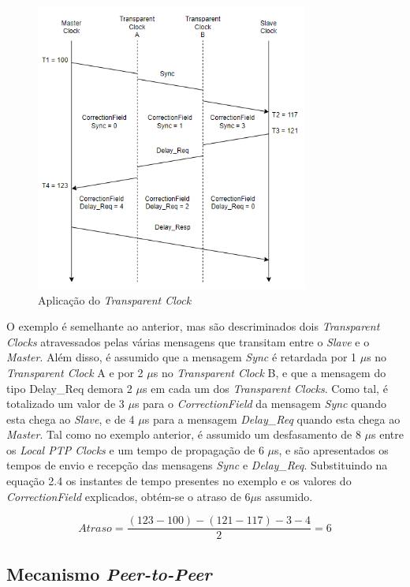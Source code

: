 \begin{figure}[!htb]
  \centering
  \includegraphics[width=0.8\textwidth]{correction.png}
  \caption[Aplicação do \textit{Transparent Clock}]{Aplicação do \textit{Transparent Clock}}
  \label{fig:airbus1}
\end{figure}


O exemplo é semelhante ao anterior, mas são descriminados dois \textit{Transparent Clocks} atravessados pelas várias mensagens que transitam entre o \textit{Slave} e o \textit{Master}. Além disso, é assumido que a mensagem \textit{Sync} é retardada por 1 $\mu$s no \textit{Transparent Clock} A e por 2 $\mu$s no \textit{Transparent Clock} B, e que a mensagem do tipo Delay\_Req demora 2 $\mu$s em cada um dos \textit{Transparent Clocks}. Como tal, é totalizado um valor de 3 $\mu$s para o \textit{CorrectionField} da mensagem \textit{Sync} quando esta chega ao \textit{Slave}, e de 4 $\mu$s para a mensagem \textit{Delay\_Req} quando esta chega ao \textit{Master}. 
Tal como no exemplo anterior, é assumido um desfasamento de 8 $\mu$s entre os \textit{Local PTP Clocks} e um tempo de propagação de 6 $\mu$s, e são apresentados os tempos de envio e recepção das mensagens \textit{Sync} e \textit{Delay\_Req}. Substituindo na equação 2.4 os instantes de tempo presentes no exemplo 
e os valores do \textit{CorrectionField} explicados, obtém-se o atraso de 6$\mu$s assumido.

\[ Atraso = \dfrac{(123 - 100) - (121 - 117) - 3 - 4}{2} = 6\]

\subsection{Mecanismo \textit{Peer-to-Peer}}

